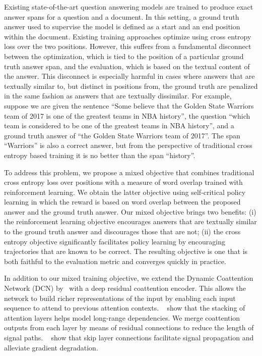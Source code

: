 \documentclass{article} %
\begin{document}
Existing state-of-the-art question answering models are trained to produce exact answer spans for a question and a document.
In this setting, a ground truth answer used to supervise the model is defined as a start and an end position within the document.
Existing training approaches optimize using cross entropy loss over the two positions.
However, this suffers from a fundamental disconnect between the optimization, which is tied to the position of a particular ground truth answer span, and the evaluation, which is based on the textual content of the answer.
This disconnect is especially harmful in cases where answers that are textually similar to, but distinct in positions from, the ground truth are penalized in the same fashion as answers that are textually dissimilar.
For example, suppose we are given the sentence ``Some believe that the Golden State Warriors team of 2017 is one of the greatest teams in NBA history'', the question ``which team is considered to be one of the greatest teams in NBA history'', and a ground truth answer of ``the Golden State Warriors team of 2017''.
The span ``Warriors'' is also a correct answer, but from the perspective of traditional cross entropy based training it is no better than the span ``history''.

To address this problem, we propose a mixed objective that combines traditional cross entropy loss over positions with a measure of word overlap trained with reinforcement learning.
We obtain the latter objective using self-critical policy learning in which the reward is based on word overlap between the proposed answer and the ground truth answer.
Our mixed objective brings two benefits: 
(i) the reinforcement learning objective encourages answers that are textually similar to the ground truth answer and discourages those that are not;
(ii) the cross entropy objective significantly facilitates policy learning by encouraging trajectories that are known to be correct.
The resulting objective is one that is both faithful to the evaluation metric and converges quickly in practice.

In addition to our mixed training objective, we extend the Dynamic Coattention Network (DCN) by~\citet{xiong2016dynamic} with a deep residual coattention encoder.
This allows the network to build richer representations of the input by enabling each input sequence to attend to previous attention contexts.
~\citet{Vaswani2017AttentionIA} show that the stacking of attention layers helps model long-range dependencies.
We merge coattention outputs from each layer by means of residual connections to reduce the length of signal paths.
~\citet{He2016DeepRL} show that skip layer connections facilitate signal propagation and alleviate gradient degradation.
\end{document}
